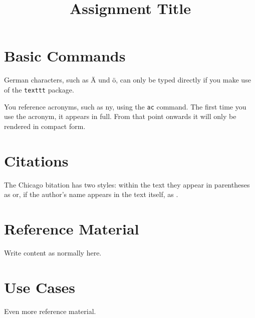 \documentclass[
    12pt                               %
    ]{article}
\author{}                             %
\title{Assignment Title}
\begin{document}
  

\maketitle

\settowidth{\parindent}{~~~~~}

\tableofcontents
\listoffigures
\listoftables


%
%

\section{Basic Commands}

German characters, such as Ä und ö, can only be typed directly if you
make use of the \texttt{texttt} package.

You reference acronyms, such as \ac{ny}, using the \texttt{ac} command.
The first time you use the acronym, it appears in full. From that point
onwards it will only be rendered in compact form.


\section{Citations}

The Chicago bitation has two styles: within the text they appear in 
parentheses as \citep{zorlu2005effect} or, if the author’s name appears
in the text itself, as \citet{zorlu2005effect}.


%
%





%
%

\appendix
\section{Reference Material}

Write content as normally here.


\section{Use Cases}

Even more reference material.


%
%

\printacronyms[include-classes=abbrev,name=Abbreviations]
\end{document}

